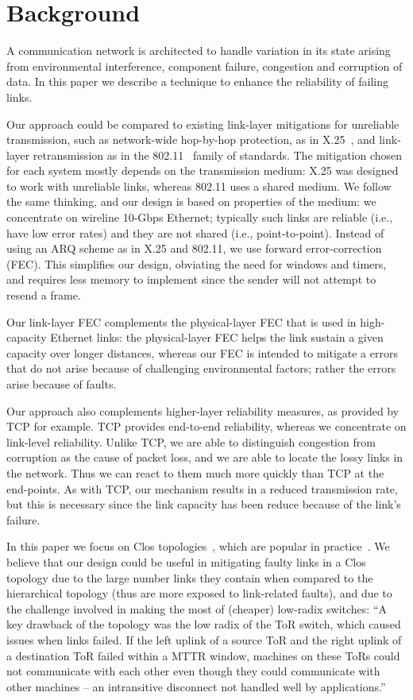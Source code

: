 \section{Background}
A communication network is architected to handle variation in its state
arising from environmental interference, component failure, congestion and
corruption of data. In this paper we describe a technique to enhance the
reliability of failing links.

Our approach could be compared to existing link-layer mitigations for
unreliable transmission, such as network-wide hop-by-hop protection, as in
X.25~\cite{X25}, and link-layer retransmission as in the 802.11~\cite{WiFi} family of
standards. The mitigation chosen for each system mostly depends on
the transmission medium: X.25 was designed to work with unreliable links,
whereas 802.11 uses a shared medium. We follow the same thinking,
and our design is based on properties of the medium: we concentrate on wireline
10-Gbps Ethernet; typically such links are reliable (i.e., have low error
rates) and they are not shared (i.e., point-to-point).
Instead of using an ARQ scheme as in X.25 and 802.11, we use forward
error-correction (FEC). This simplifies our design, obviating the need for
windows and timers, and requires less memory to implement since the sender
will not attempt to resend a frame.

Our link-layer FEC complements the physical-layer FEC that is used in
high-capacity Ethernet links: the physical-layer FEC helps the link sustain a
given capacity over longer distances, whereas our FEC is intended to mitigate
a errors that do not arise because of challenging environmental factors; rather
the errors arise because of faults.

Our approach also complements higher-layer reliability measures, as provided by
TCP for example.  TCP provides end-to-end reliability, whereas we concentrate
on link-level reliability. Unlike TCP, we are able to distinguish congestion
from corruption as the cause of packet loss, and we are able to locate the
lossy links in the network. Thus we can react to them much more quickly than
TCP at the end-points. As with TCP, our mechanism results in a reduced
transmission rate, but this is necessary since the link capacity has been
reduce because of the link's failure.

In this paper we focus on Clos
topologies~\cite{Al-Fares:2008:SCD:1402946.1402967}, which are popular in
practice~\cite{Singh:2016:JRD:2991470.2975159}.
We believe that our design could be useful in mitigating faulty links in a Clos
topology due to the large number links they contain when compared to the
hierarchical topology (thus are more exposed to link-related faults), and due
to the challenge involved in making the most of (cheaper) low-radix switches:
``A key drawback of the topology was the low radix of
the ToR switch, which caused issues when links failed.
If the left uplink of a source ToR and the right uplink
of  a  destination  ToR  failed  within  a  MTTR  window,
machines  on  these  ToRs  could  not  communicate  with
each other even though they could communicate with
other machines -- an intransitive disconnect not handled
well by applications.''~\cite[\S3.1]{Singh:2016:JRD:2991470.2975159}

